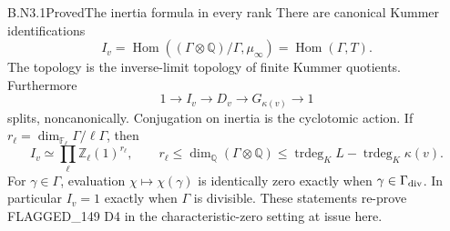 \begin{claim}{B.N3.1}{Proved}{The inertia formula in every rank}
There are canonical Kummer identifications
\[
 I_v=\operatorname{Hom}((\Gamma\otimes\mathbb Q)/\Gamma,\mu_\infty)
     =\operatorname{Hom}(\Gamma,T).
\]
The topology is the inverse-limit topology of finite Kummer quotients.
Furthermore
\[
 1\longrightarrow I_v\longrightarrow D_v\longrightarrow
 G_{\kappa(v)}\longrightarrow1
\]
splits, noncanonically.  Conjugation on inertia is the cyclotomic action.
If $r_\ell=\dim_{\mathbb F_\ell}\Gamma/\ell\Gamma$, then
\[
 I_v\simeq\prod_\ell\mathbb Z_\ell(1)^{r_\ell},\qquad
 r_\ell\leq\dim_{\mathbb Q}(\Gamma\otimes\mathbb Q)
 \leq\operatorname{trdeg}_K L-\operatorname{trdeg}_K\kappa(v).
\]
For $\gamma\in\Gamma$, evaluation
$\chi\mapsto\chi(\gamma)$ is identically zero exactly when
$\gamma\in\Gamma_{\rm div}$.  In particular $I_v=1$ exactly when
$\Gamma$ is divisible.  These statements re-prove FLAGGED\_149 D4
in the characteristic-zero setting at issue here.
\end{claim}
